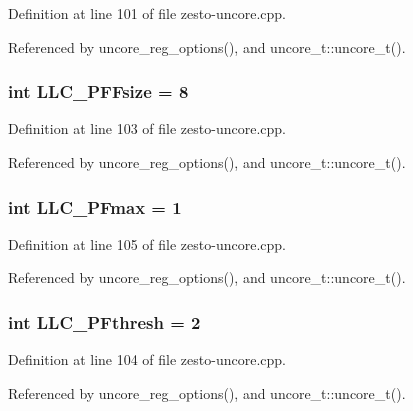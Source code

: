 Definition at line 101 of file zesto-uncore.cpp.

Referenced by uncore\_\-reg\_\-options(), and uncore\_\-t::uncore\_\-t().
\subsubsection[{LLC\_\-PFFsize}]{\setlength{\rightskip}{0pt plus 5cm}int {\bf LLC\_\-PFFsize} = 8\hspace{0.3cm}{\tt  [static]}}\label{zesto-uncore_8cpp_7eca2c34ae7d882c361e9f8919108336}




Definition at line 103 of file zesto-uncore.cpp.

Referenced by uncore\_\-reg\_\-options(), and uncore\_\-t::uncore\_\-t().
\subsubsection[{LLC\_\-PFmax}]{\setlength{\rightskip}{0pt plus 5cm}int {\bf LLC\_\-PFmax} = 1\hspace{0.3cm}{\tt  [static]}}\label{zesto-uncore_8cpp_8d3bf45134d0d8836fc902b84408d1d5}




Definition at line 105 of file zesto-uncore.cpp.

Referenced by uncore\_\-reg\_\-options(), and uncore\_\-t::uncore\_\-t().
\subsubsection[{LLC\_\-PFthresh}]{\setlength{\rightskip}{0pt plus 5cm}int {\bf LLC\_\-PFthresh} = 2\hspace{0.3cm}{\tt  [static]}}\label{zesto-uncore_8cpp_5629708ad2ac6661509c6efa5ab3d61e}




Definition at line 104 of file zesto-uncore.cpp.

Referenced by uncore\_\-reg\_\-options(), and uncore\_\-t::uncore\_\-t().
